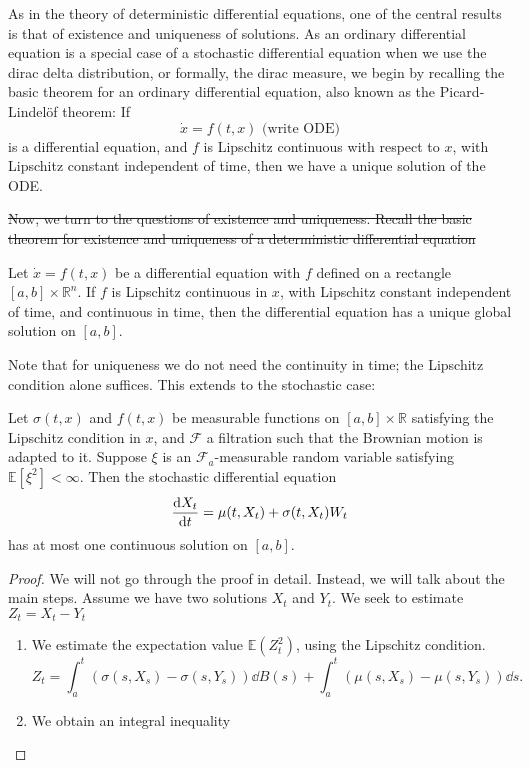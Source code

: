 \documentclass[prb,12pt]{revtex4-2}
\theoremstyle{definition}
\theoremstyle{definition}
\theoremstyle{definition}
\newcommand{\R}{\mathbb{R}}
\begin{document}
{	{\color{red} As in the theory of deterministic differential equations, one of the central results is that of existence and uniqueness of solutions. As an ordinary differential equation is a special case of a stochastic differential equation when we use the dirac delta distribution, or formally, the dirac measure, we begin by recalling the basic theorem for an ordinary differential equation, also known as the Picard-Lindelöf theorem: If
	\[\dot{x}= f(t,x)\text{ (write ODE)}\]
	is a differential equation, and $f$ is Lipschitz continuous with respect to $x$, with Lipschitz constant independent of time, then we have a unique solution of the ODE.}
	
	{\color{red} \sout{Now, we turn to the questions of existence and uniqueness. Recall the basic theorem for existence and uniqueness of a deterministic differential equation}}
	\begin{Theorem}
		Let $\dot{x} = f(t,x)$ be a differential equation with $f$ defined on a rectangle $[a,b]\times \R^n$. If $f$ is Lipschitz continuous in $x$, with Lipschitz constant independent of time, and continuous in time, then the differential equation has a unique global solution on $[a,b]$.
	\end{Theorem}
	Note that for uniqueness we do not need the continuity in time; the Lipschitz condition alone suffices. This extends to the stochastic case:
	\begin{Theorem}
		Let $\sigma(t,x)$ and $f(t,x)$ be measurable functions on $[a,b]\times \R$ satisfying the Lipschitz condition in $x$, and $\mathcal{F}$ a filtration such that the Brownian motion is adapted to it. Suppose $\xi$ is an $\mathcal{F}_a$-measurable random variable satisfying $\mathbb{E}[\xi^2]<\infty$. Then the stochastic differential equation
		\[\dv{X_t}{t}=\mu(t, X_t)+\sigma(t, X_t)W_t\]
		has at most one continuous solution on $[a,b]$.
	\end{Theorem}
	\begin{proof}
		We will not go through the proof in detail. Instead, we will talk about the main steps. Assume we have two solutions $X_t$ and $Y_t$. We seek to estimate $Z_t=X_t-Y_t$
		\begin{enumerate}
			\item We estimate the expectation value $\mathbb{E}(Z_t^2)$, using the Lipschitz condition.
			{\color{red}
					\[Z_t = \int_a^t (\sigma(s, X_s) - \sigma (s, Y_s))\dd{B(s)}+\int_a^t (\mu(s, X_s) - \mu(s, Y_s))\dd{s}.\]}
			\item We obtain an integral inequality

\end{enumerate}
\end{proof}}
\end{document}
